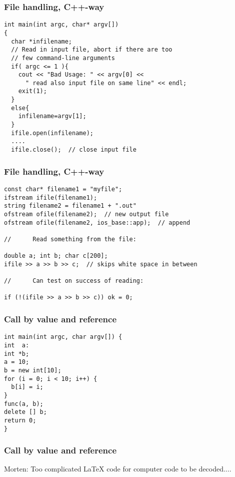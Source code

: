 \documentclass{beamer}
\begin{document}
\begin{frame}
\frametitle{File handling, C++-way}

\begin{verbatim}
int main(int argc, char* argv[])
{
  char *infilename;
  // Read in input file, abort if there are too
  // few command-line arguments
  if( argc <= 1 ){
    cout << "Bad Usage: " << argv[0] <<
      " read also input file on same line" << endl;
    exit(1);
  }
  else{
    infilename=argv[1];
  }
  ifile.open(infilename);
  ....
  ifile.close();  // close input file
\end{verbatim}
\end{frame}

\begin{frame}
\frametitle{File handling, C++-way}

\begin{verbatim}
const char* filename1 = "myfile";
ifstream ifile(filename1);
string filename2 = filename1 + ".out"
ofstream ofile(filename2);  // new output file
ofstream ofile(filename2, ios_base::app);  // append

//      Read something from the file:

double a; int b; char c[200];
ifile >> a >> b >> c;  // skips white space in between

//      Can test on success of reading:

if (!(ifile >> a >> b >> c)) ok = 0;
\end{verbatim}
\end{frame}

\begin{frame}
\frametitle{Call by value and reference}

\begin{verbatim}
int main(int argc, char argv[]) {
int  a:
int *b;
a = 10;
b = new int[10];
for (i = 0; i < 10; i++) {
  b[i] = i;
}
func(a, b);
delete [] b;
return 0;
}
\end{verbatim}
\end{frame}

\begin{frame}
\frametitle{Call by value and reference}

Morten: Too complicated {\LaTeX} code for computer code to be
decoded....
\end{frame}
\end{document}

